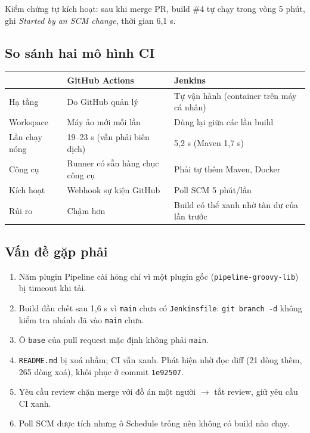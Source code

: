 \documentclass[12pt,a4paper]{article}
\newcommand{\commit}[1]{\texttt{#1}}
\begin{document}
Kiểm chứng tự kích hoạt: sau khi merge PR, build \#4 tự chạy trong vòng 5 phút,
ghi \emph{Started by an SCM change}, thời gian 6,1 s.

\subsection{So sánh hai mô hình CI}

\begin{center}
\begin{tabularx}{\linewidth}{lXX}
\toprule
& GitHub Actions & Jenkins \\
\midrule
Hạ tầng & Do GitHub quản lý & Tự vận hành (container trên máy cá nhân) \\
Workspace & Máy ảo mới mỗi lần & Dùng lại giữa các lần build \\
Lần chạy nóng & 19–23 s (vẫn phải biên dịch) & 5,2 s (Maven 1,7 s) \\
Công cụ & Runner có sẵn hàng chục công cụ & Phải tự thêm Maven, Docker \\
Kích hoạt & Webhook sự kiện GitHub & Poll SCM 5 phút/lần \\
Rủi ro & Chậm hơn & Build có thể xanh nhờ tàn dư của lần trước \\
\bottomrule
\end{tabularx}
\end{center}

\subsection{Vấn đề gặp phải}
\begin{enumerate}
  \item Năm plugin Pipeline cài hỏng chỉ vì một plugin gốc
        (\texttt{pipeline-groovy-lib}) bị timeout khi tải.
  \item Build đầu chết sau 1,6 s vì \texttt{main} chưa có \texttt{Jenkinsfile}:
        \texttt{git branch -d} không kiểm tra nhánh đã vào \texttt{main} chưa.
  \item Ô \texttt{base} của pull request mặc định không phải \texttt{main}.
  \item \texttt{README.md} bị xoá nhầm; CI vẫn xanh. Phát hiện nhờ đọc diff
        (21 dòng thêm, 265 dòng xoá), khôi phục ở commit \commit{1e92507}.
  \item Yêu cầu review chặn merge với đồ án một người $\rightarrow$ tắt review,
        giữ yêu cầu CI xanh.
  \item Poll SCM được tích nhưng ô Schedule trống nên không có build nào chạy.
\end{enumerate}
\end{document}
